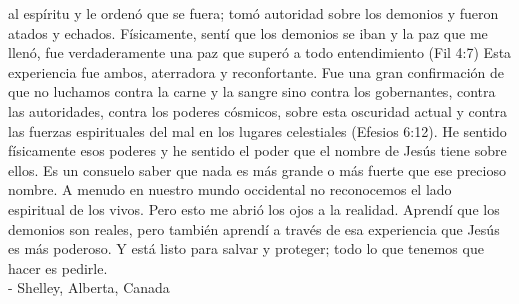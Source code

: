 \documentclass[twoside, 12pt]{book}
\begin{document}
al espíritu y le ordenó que se fuera; tomó autoridad sobre los demonios y fueron atados y echados. Físicamente, sentí que los demonios se iban y la paz que me llenó, fue verdaderamente una paz que superó a todo entendimiento (Fil 4:7) Esta experiencia fue ambos, aterradora y reconfortante. Fue una gran confirmación de que no luchamos contra la carne y la sangre sino contra los gobernantes, contra las autoridades, contra los poderes cósmicos, sobre esta oscuridad actual y contra las fuerzas espirituales del mal en los lugares celestiales (Efesios 6:12). He sentido físicamente esos poderes y he sentido el poder que el nombre de Jesús tiene sobre ellos. Es un consuelo saber que nada es más grande o más fuerte que ese precioso nombre. A menudo en nuestro mundo occidental no reconocemos el lado espiritual de los vivos. Pero esto me abrió los ojos a la realidad. Aprendí que los demonios son reales, pero también aprendí a través de esa experiencia que Jesús es más poderoso. Y está listo para salvar y proteger; todo lo que tenemos que hacer es pedirle. \\

- Shelley, Alberta, Canada
\clearpage

\end{document}
